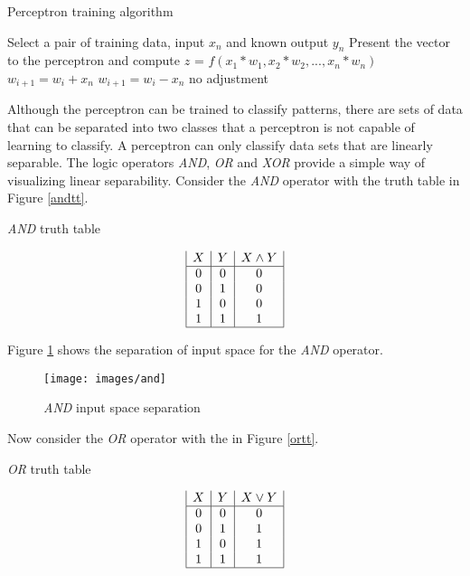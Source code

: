 \begin{algorithm}[h!]
\caption{Perceptron training algorithm}
\label{perceptronAlg}    
\begin{algorithmic}

\STATE Select a pair of training data, input $x_n$ and known output $y_n$
\STATE Present the vector to the perceptron and compute $z$ = $f(x_1 * w_1, x_2 * w_2, ..., x_n * w_n)$
\STATE $w_{i+1} = w_i + x_n$
\STATE $w_{i+1} = w_i - x_n$
 \ELSE
\STATE no adjustment
\ENDIF
\ENDWHILE
\end{algorithmic}
\end{algorithm}

Although the perceptron can be trained to classify patterns, there are sets of data that can be separated into two classes that a perceptron is not capable of learning to classify.
A perceptron can only classify data sets that are linearly separable.
The logic operators {\it AND}, {\it OR} and {\it XOR} provide a simple way of visualizing linear separability.
Consider the {\it AND} operator with the truth table in Figure \ref{andtt}.
\begin{table}[h!]
  \caption{{\it AND} truth table}
  \label{andtt}
\begin{displaymath}
\begin{array}{|c|c|c|}
   X
 & Y
 & X \land Y
\\
\hline
0 & 0 & 0\\
0 & 1 & 0\\
1 & 0 & 0\\
1 & 1 & 1\\
\hline
\end{array}
\end{displaymath}
\end{table}

Figure \ref{ands} shows the separation of input space for the {\it AND} operator.

\begin{figure}[h!]
  \centering
  \texttt{[image: images/and]}
  \caption{{\it AND} input space separation}
  \label{ands}
\end{figure}

Now consider the {\it OR} operator with the in Figure \ref{ortt}. 

\begin{table}[h!]
\caption{{\it OR} truth table}
\label{ortt}
\begin{displaymath}
\begin{array}{|c|c|c|}
   X
 & Y
 & X \lor Y
\\
\hline
0 & 0 & 0\\
0 & 1 & 1\\
1 & 0 & 1\\
1 & 1 & 1\\
\hline
\end{array}
\end{displaymath}
\end{table}

